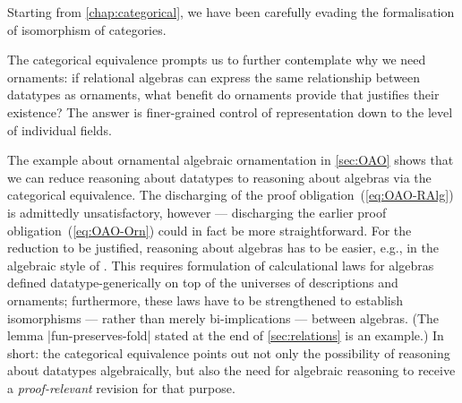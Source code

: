 Starting from \autoref{chap:categorical}, we have been carefully evading the formalisation of isomorphism of categories.


The categorical equivalence prompts us to further contemplate why we need ornaments: if relational algebras can express the same relationship between datatypes as ornaments, what benefit do ornaments provide that justifies their existence?
The answer is finer-grained control of representation down to the level of individual fields.

The example about ornamental algebraic ornamentation in \autoref{sec:OAO} shows that we can reduce reasoning about datatypes to reasoning about algebras via the categorical equivalence.
The discharging of the proof obligation~(\ref{eq:OAO-RAlg}) is admittedly unsatisfactory, however --- discharging the earlier proof obligation~(\ref{eq:OAO-Orn}) could in fact be more straightforward.
For the reduction to be justified, reasoning about algebras has to be easier, e.g., in the algebraic style of \citet{Bird-AoP}.
This requires formulation of calculational laws for algebras defined datatype-generically on top of the universes of descriptions and ornaments; furthermore, these laws have to be strengthened to establish isomorphisms --- rather than merely bi-implications --- between algebras.
(The lemma |fun-preserves-fold| stated at the end of \autoref{sec:relations} is an example.)
In short: the categorical equivalence points out not only the possibility of reasoning about datatypes algebraically, but also the need for algebraic reasoning to receive a \emph{proof-relevant} revision for that purpose.
